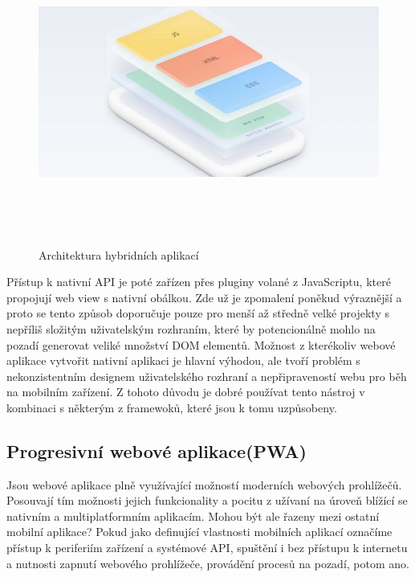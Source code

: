 \documentclass[
  biblatex,
  glossaries,
  index
]{kidiplom}
\begin{document}
\begin{figure}[H]
  	\centering
 	 \includegraphics[width=12cm,height=10cm,keepaspectratio]{hybridni_aplikace}
 	 \caption{\cite{5} Architektura hybridních aplikací}
 	 \label{fig:blah}
\end{figure}



Přístup k nativní API je poté zařízen přes pluginy volané z JavaScriptu, které propojují web view s nativní obálkou. Zde už je zpomalení poněkud výraznější a proto se tento způsob doporučuje pouze pro menší až středně velké projekty s nepříliš složitým uživatelským rozhraním, které by potencionálně mohlo na pozadí generovat veliké množství DOM elementů. Možnost z kterékoliv webové aplikace vytvořit nativní aplikaci je hlavní výhodou, ale tvoří problém s nekonzistentním designem uživatelského rozhraní a nepřipraveností webu pro běh na mobilním zařízení. Z tohoto důvodu je dobré používat tento nástroj v kombinaci s některým z framewoků, které jsou k tomu uzpůsobeny.

\subsection{Progresivní webové aplikace(PWA)}
Jsou webové aplikace plně využívající možností moderních webových prohlížečů. Posouvají tím možnosti jejich funkcionality a pocitu z užívaní na úroveň blížící se nativním a multiplatformním aplikacím. Mohou být ale řazeny mezi ostatní mobilní aplikace? Pokud jako definující vlastnosti mobilních aplikací označíme přístup k periferiím zařízení a systémové API, spuštění i bez přístupu k internetu a nutnosti zapnutí webového prohlížeče, provádění procesů na pozadí, potom ano.
\end{document}
